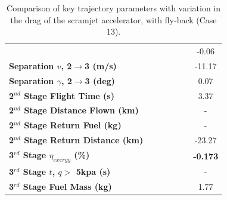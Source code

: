 \begin{table}[ht]
\begin{tabular}{l c c c c c c}
		& \secondthirdSeparationAltCdNinety
		& \secondthirdSeparationAltCdNinetyFive
		& \secondthirdSeparationAltCdStandard
		& \secondthirdSeparationAltCdOneHundredFive
		& \secondthirdSeparationAltCdOneHundredTen
		&-0.06
		\\
		\textbf{Separation $v$, 2$\rightarrow$3 (m/s)}
		& \secondthirdSeparationvCdNinety
		& \secondthirdSeparationvCdNinetyFive
		& \secondthirdSeparationvCdStandard
		& \secondthirdSeparationvCdOneHundredFive
		& \secondthirdSeparationvCdOneHundredTen
		&-11.17
		\\
		\textbf{Separation $\gamma$, 2$\rightarrow$3 (deg)}
		& \secondthirdSeparationgammaCdNinety
		& \secondthirdSeparationgammaCdNinetyFive
		& \secondthirdSeparationgammaCdStandard
		& \secondthirdSeparationgammaCdOneHundredFive
		& \secondthirdSeparationgammaCdOneHundredTen
		&0.07
		\\
		\textbf{2$^{nd}$ Stage Flight Time (s)}
		& \secondFlightTimeCdNinety
		& \secondFlightTimeCdNinetyFive
		& \secondFlightTimeCdStandard
		& \secondFlightTimeCdOneHundredFive
		& \secondFlightTimeCdOneHundredTen
		&3.37
		\\
		\textbf{2$^{nd}$ Stage Distance Flown (km)}
		& \SecondDistCdNinety
		& \SecondDistCdNinetyFive
		& \SecondDistCdStandard
		& \SecondDistCdOneHundredFive
		& \SecondDistCdOneHundredTen
		& -
		\\
		\textbf{2$^{nd}$ Stage Return Fuel (kg)}
		& \returnFuelCdNinety
		& \returnFuelCdNinetyFive
		& \returnFuelCdStandard
		& \returnFuelCdOneHundredFive
		& \returnFuelCdOneHundredTen
		& -
		\\
		\textbf{2$^{nd}$ Stage Return Distance (km)}
		& \returnDistCdNinety
		& \returnDistCdNinetyFive
		& \returnDistCdStandard
		& \returnDistCdOneHundredFive
		& \returnDistCdOneHundredTen
		&-23.27
		\\
		\hline 
		\textbf{3$^{rd}$ Stage $\eta_{exergy}$ (\%)}
		& \textbf{\thirddExergyEffCdNinety}
		& \textbf{\thirddExergyEffCdNinetyFive}
		& \textbf{\thirddExergyEffCdStandard}
		& \textbf{\thirddExergyEffCdOneHundredFive}
		& \textbf{\thirddExergyEffCdOneHundredTen}
		& \textbf{-0.173}
		\\
		\textbf{3$^{rd}$ Stage $t$, $q >$ 5kpa (s)}
		& \thirdqOverFiveCdNinety
		& \thirdqOverFiveCdNinetyFive
		& \thirdqOverFiveCdStandard
		& \thirdqOverFiveCdOneHundredFive
		& \thirdqOverFiveCdOneHundredTen
		& -
		\\
		\textbf{3$^{rd}$ Stage Fuel Mass (kg)}
		& \thirdmFuelCdNinety
		& \thirdmFuelCdNinetyFive
		& \thirdmFuelCdStandard
		& \thirdmFuelCdOneHundredFive
		& \thirdmFuelCdOneHundredTen
		& 1.77
		\\
		\hline 
	\end{tabular} 
	\caption{Comparison of key trajectory parameters with variation in the drag of the scramjet accelerator, with fly-back (Case 13).}
	\label{tab:comparison41}
\end{table}

